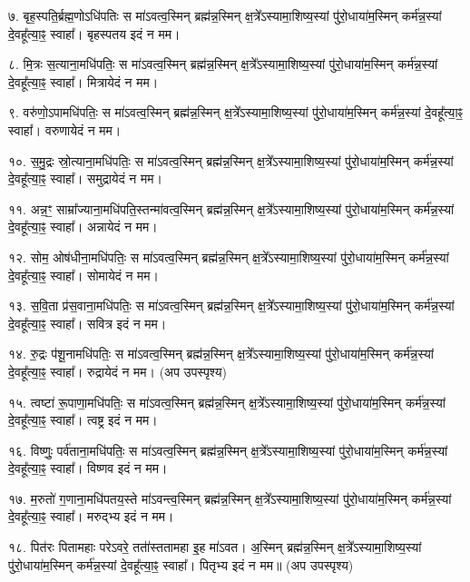 ७. बृह॒स्पति॒र्ब्रह्म॒णोऽधि॑पतिः स मा॑ऽवत्व॒स्मिन् ब्रह्म॑न्न॒स्मिन् क्ष॒त्रे᳚ऽस्यामा॒शिष्य॒स्यां पु॑रो॒धाया॑म॒स्मिन् कर्म॑न्न॒स्यां दे॒वहू᳚त्या॒ꣴ॒ स्वाहा᳚। बृहस्पतय इदं न मम।

८. मि॒त्रः स॒त्याना॒मधि॑पतिः॒ स मा॑ऽवत्व॒स्मिन् ब्रह्म॑न्न॒स्मिन् क्ष॒त्रे᳚ऽस्यामा॒शिष्य॒स्यां पु॑रो॒धाया॑म॒स्मिन् कर्म॑न्न॒स्यां दे॒वहू᳚त्या॒ꣴ॒ स्वाहा᳚। मित्रायेदं न मम।

९. वरु॑णो॒ऽपामधि॑पतिः॒ स मा॑ऽवत्व॒स्मिन् ब्रह्म॑न्न॒स्मिन् क्ष॒त्रे᳚ऽस्यामा॒शिष्य॒स्यां पु॑रो॒धाया॑म॒स्मिन् कर्म॑न्न॒स्यां दे॒वहू᳚त्या॒ꣴ॒ स्वाहा᳚। वरुणायेदं न मम।

१०. स॒मु॒द्रः स्रो॒त्याना॒मधि॑पतिः॒ स मा॑ऽवत्व॒स्मिन् ब्रह्म॑न्न॒स्मिन् क्ष॒त्रे᳚ऽस्यामा॒शिष्य॒स्यां पु॑रो॒धाया॑म॒स्मिन् कर्म॑न्न॒स्यां दे॒वहू᳚त्या॒ꣴ॒ स्वाहा᳚। समुद्रायेदं न मम।

११. अन्न॒ꣳ॒ साम्रा᳚ज्याना॒मधि॑पति॒स्तन्मा॑वत्व॒स्मिन् ब्रह्म॑न्न॒स्मिन् क्ष॒त्रे᳚ऽस्यामा॒शिष्य॒स्यां पु॑रो॒धाया॑म॒स्मिन् कर्म॑न्न॒स्यां दे॒वहू᳚त्या॒ꣴ॒ स्वाहा᳚। अन्नायेदं न मम।

१२. सोम॒ ओष॑धीना॒मधि॑पतिः॒ स मा॑ऽवत्व॒स्मिन् ब्रह्म॑न्न॒स्मिन् क्ष॒त्रे᳚ऽस्यामा॒शिष्य॒स्यां पु॑रो॒धाया॑म॒स्मिन् कर्म॑न्न॒स्यां दे॒वहू᳚त्या॒ꣴ॒ स्वाहा᳚। सोमायेदं न मम।

१३. स॒वि॒ता प्र॑स॒वाना॒मधि॑पतिः॒ स मा॑ऽवत्व॒स्मिन् ब्रह्म॑न्न॒स्मिन् क्ष॒त्रे᳚ऽस्यामा॒शिष्य॒स्यां पु॑रो॒धाया॑म॒स्मिन् कर्म॑न्न॒स्यां दे॒वहू᳚त्या॒ꣴ॒ स्वाहा᳚। सवित्र इदं न मम।

१४. रु॒द्रः प॑शू॒नामधि॑पतिः॒ स मा॑ऽवत्व॒स्मिन् ब्रह्म॑न्न॒स्मिन् क्ष॒त्रे᳚ऽस्यामा॒शिष्य॒स्यां पु॑रो॒धाया॑म॒स्मिन् कर्म॑न्न॒स्यां दे॒वहू᳚त्या॒ꣴ॒ स्वाहा᳚। रुद्रायेदं न मम। (अप उपस्पृश्य)

१५. त्वष्टा॑ रू॒पाणा॒मधि॑पतिः॒ स मा॑ऽवत्व॒स्मिन् ब्रह्म॑न्न॒स्मिन् क्ष॒त्रे᳚ऽस्यामा॒शिष्य॒स्यां पु॑रो॒धाया॑म॒स्मिन् कर्म॑न्न॒स्यां दे॒वहू᳚त्या॒ꣴ॒ स्वाहा᳚। त्वष्ट्र इदं न मम।

१६. विष्णुः॒ पर्व॑ताना॒मधि॑पतिः॒ स मा॑ऽवत्व॒स्मिन् ब्रह्म॑न्न॒स्मिन् क्ष॒त्रे᳚ऽस्यामा॒शिष्य॒स्यां पु॑रो॒धाया॑म॒स्मिन् कर्म॑न्न॒स्यां दे॒वहू᳚त्या॒ꣴ॒ स्वाहा᳚। विष्णव इदं न मम।

१७. म॒रुतो॑ ग॒णाना॒मधि॑पतय॒स्ते मा॑ऽवन्त्व॒स्मिन् ब्रह्म॑न्न॒स्मिन् क्ष॒त्रे᳚ऽस्यामा॒शिष्य॒स्यां पु॑रो॒धाया॑म॒स्मिन् कर्म॑न्न॒स्यां दे॒वहू᳚त्या॒ꣴ॒ स्वाहा᳚। मरुद्भ्य इदं न मम।

१८. पित॑रः पितामहाः परेऽवरे॒ तता॑॑स्ततामहा इ॒ह मा॑ऽवत। अ॒स्मिन् ब्रह्म॑न्न॒स्मिन् क्ष॒त्रे᳚ऽस्यामा॒शिष्य॒स्यां पु॑रो॒धाया॑म॒स्मिन् कर्म॑न्न॒स्यां दे॒वहू᳚त्या॒ꣴ॒ स्वाहा᳚। पितृभ्य इदं न मम॥ (अप उपस्पृश्य)


